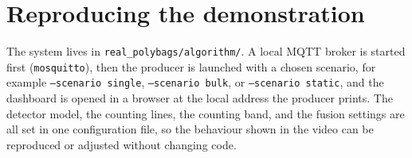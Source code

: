 \documentclass[11pt,a4paper]{article}
\newcommand{\code}[1]{\texttt{#1}}
\begin{document}
\section{Reproducing the demonstration}

The system lives in \code{real\_polybags/algorithm/}. A local MQTT broker is
started first (\code{mosquitto}), then the producer is launched with a chosen
scenario, for example \code{--scenario single}, \code{--scenario bulk}, or
\code{--scenario static}, and the dashboard is opened in a browser at the local
address the producer prints. The detector model, the counting lines, the counting
band, and the fusion settings are all set in one configuration file, so the
behaviour shown in the video can be reproduced or adjusted without changing code.
\end{document}

